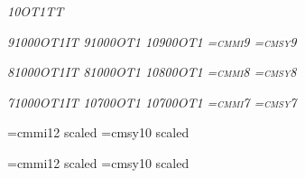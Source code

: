 {{{%
\setfont{}
\setfont{}
\setfont{}\slshape{10}{\magstephalf}{OT1TT}
\setfont{}
\def\df{\let\ttfont=\deftt \let\bffont = \defbf
\let\slfont=\defsl \let\ttslfont=\defttsl \bf}

\def\smallnominalsize{9pt}
\setfont\smallrm{}
\setfont\smalltt{}
\setfont\smallbf{}
\setfont\smallit\itshape{9}{1000}{OT1IT}
\setfont\smallsl\slshape{9}{1000}{OT1}
\setfont\smallsf{}
\setfont\smallsc\scshape{10}{900}{OT1}
\setfont\smallttsl{}
\font\smalli=cmmi9
\font\smallsy=cmsy9
\def\smallecsize{0900}

\def\smallernominalsize{8pt}
\setfont\smallerrm{}
\setfont\smallertt{}
\setfont\smallerbf{}
\setfont\smallerit\itshape{8}{1000}{OT1IT}
\setfont\smallersl\slshape{8}{1000}{OT1}
\setfont\smallersf{}
\setfont\smallersc\scshape{10}{800}{OT1}
\setfont\smallerttsl{}
\font\smalleri=cmmi8
\font\smallersy=cmsy8
\def\smallerecsize{0800}

\def\sevennominalsize{7pt}
\setfont\sevenrm{}
\setfont\seventt{}
\setfont\sevenbf{}
\setfont\sevenit\itshape{7}{1000}{OT1IT}
\setfont\sevensl\slshape{10}{700}{OT1}
\setfont\sevensf{}
\setfont\sevensc\scshape{10}{700}{OT1}
\setfont\seventtsl{}
\font\seveni=cmmi7
\font\sevensy=cmsy7
\def\sevenecsize{0700}

\def\titlenominalsize{20pt}
\setfont\titlerm{}
\setfont\titleit{}
\setfont\titlesl{}
\setfont\titlett{}
\setfont\titlettsl{}
\setfont\titlesf{}
\let\titlebf=\titlerm
\setfont\titlesc{}
\font\titlei=cmmi12 scaled 
\font\titlesy=cmsy10 scaled 
\def\titleecsize{2074}

\def\chapnominalsize{14pt}
\setfont\chaprm{}
\setfont\chapit{}
\setfont\chapsl{}
\setfont\chaptt{}
\setfont\chapttsl{}
\setfont\chapsf{}
\let\chapbf\chaprm
\setfont\chapsc{}
\font\chapi=cmmi12 scaled 
\font\chapsy=cmsy10 scaled 
\def\chapecsize{1440}

}}}
